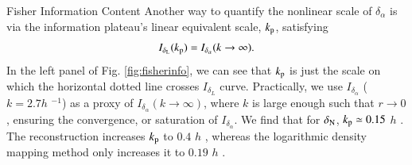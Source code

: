 \begin{section}{Fisher Information Content}
  Another way to quantify the nonlinear scale of $\delta_\alpha$
  is via the information plateau's linear equivalent scale, $k\textcolor{black}{_\mathrm{p}}$, satisfying
  \begin{equation}
      I_{\delta_\mathrm{\textcolor{black}{L}}}(k\textcolor{black}{_\mathrm{p}})=I_{\delta_{\alpha}}(k\rightarrow\infty).
  \end{equation}
  In the left panel of Fig. \ref{fig:fisherinfo}, we can see that 
  $k\textcolor{black}{_\mathrm{p}}$ is just the scale on which 
  the horizontal dotted line crosses $I_{\delta_{L}}$ curve.
  Practically, we use $I_{\delta_{\alpha}}$ ($k=2.7 h$ $^{-1}$)
  as a proxy of $I_{\delta_{\alpha}}(k\rightarrow\infty)$,
  where $k$ is large enough such that $r\rightarrow 0$, ensuring
  the convergence, or saturation of $I_{\delta_{\alpha}}$.
  We find that
  for $\delta_\mathrm{\textcolor{black}{N}}$, $k\textcolor{black}{_\mathrm{p}}\simeq 0.15$ $h$ .
  The  reconstruction increases $k\textcolor{black}{_\mathrm{p}}$ to $0.4$ $h$ ,
  whereas the logarithmic density mapping method only increases it to $0.19$ $h$ .


\end{section}
